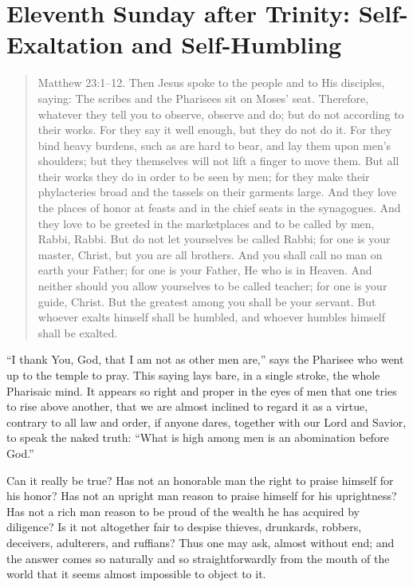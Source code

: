

\section{Eleventh Sunday after Trinity: Self-Exaltation and Self-Humbling}


\begin{quote}

Matthew 23:1–12. Then Jesus spoke to the people and to His disciples, saying: The scribes and the Pharisees sit on Moses’ seat. Therefore, whatever they tell you to observe, observe and do; but do not according to their works. For they say it well enough, but they do not do it. For they bind heavy burdens, such as are hard to bear, and lay them upon men’s shoulders; but they themselves will not lift a finger to move them. But all their works they do in order to be seen by men; for they make their phylacteries broad and the tassels on their garments large. And they love the places of honor at feasts and in the chief seats in the synagogues. And they love to be greeted in the marketplaces and to be called by men, Rabbi, Rabbi. But do not let yourselves be called Rabbi; for one is your master, Christ, but you are all brothers. And you shall call no man on earth your Father; for one is your Father, He who is in Heaven. And neither should you allow yourselves to be called teacher; for one is your guide, Christ. But the greatest among you shall be your servant. But whoever exalts himself shall be humbled, and whoever humbles himself shall be exalted.

\end{quote}

\bigskip


“I thank You, God, that I am not as other men are,” says the Pharisee who went up to the temple to pray. This saying lays bare, in a single stroke, the whole Pharisaic mind. It appears so right and proper in the eyes of men that one tries to rise above another, that we are almost inclined to regard it as a virtue, contrary to all law and order, if anyone dares, together with our Lord and Savior, to speak the naked truth: “What is high among men is an abomination before God.”

Can it really be true? Has not an honorable man the right to praise himself for his honor? Has not an upright man reason to praise himself for his uprightness? Has not a rich man reason to be proud of the wealth he has acquired by diligence? Is it not altogether fair to despise thieves, drunkards, robbers, deceivers, adulterers, and ruffians? Thus one may ask, almost without end; and the answer comes so naturally and so straightforwardly from the mouth of the world that it seems almost impossible to object to it.

